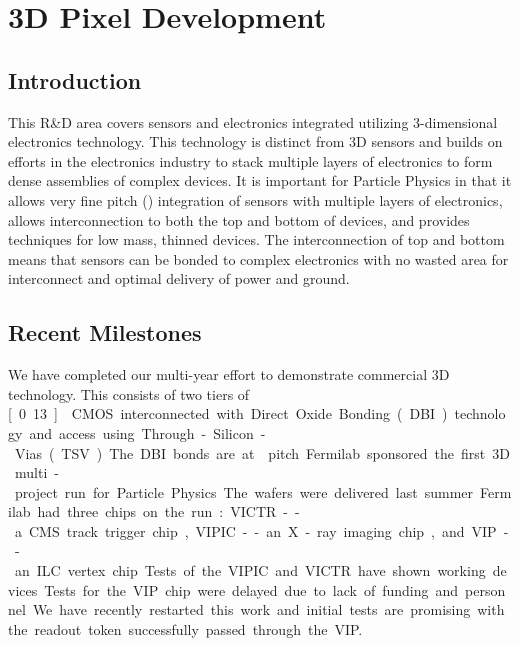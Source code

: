 \section{3D Pixel Development}
\subsection{Introduction}
This R\&D area covers sensors and electronics integrated utilizing 3-dimensional electronics technology.  This technology is distinct from 3D sensors and builds on efforts in the electronics industry to stack multiple layers of electronics to form dense assemblies of complex devices.  It is important for Particle Physics in that it allows very fine pitch (\unit[4]{\micron}) integration of sensors with multiple layers of electronics, allows interconnection to both the top and bottom of devices, and provides techniques for low mass, thinned devices. The interconnection of top and bottom means that sensors can be bonded to complex electronics with no wasted area for interconnect and optimal delivery of power and ground.

\subsection{Recent Milestones}
We have completed our multi-year effort to demonstrate commercial 3D technology. This consists of two tiers of \unit[0.13]{\micron} CMOS interconnected with Direct Oxide Bonding (DBI) technology and access using Through-Silicon-Vias (TSV). The DBI bonds are at \unit[4]{\micron} pitch. Fermilab sponsored the first 3D multi-project run for Particle Physics. The wafers were delivered last summer. Fermilab had three chips on the run: VICTR -- a CMS track trigger chip, VIPIC -- an X-ray imaging chip, and VIP -- an ILC vertex chip. Tests of the VIPIC and VICTR have shown working devices.  Tests for the VIP chip were delayed due to lack of funding and personnel.  We have recently restarted this work and initial tests are promising with the readout token successfully passed through the VIP.

